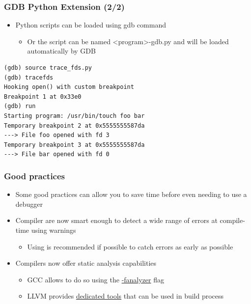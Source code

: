 \begin{frame}[fragile]
  \frametitle{GDB Python Extension (2/2)}
  \begin{itemize}
    \item Python scripts can be loaded using gdb  command
    \begin{itemize}
      \item Or the script can be named <program>-gdb.py and will be loaded automatically by GDB
    \end{itemize}
  \end{itemize}
  \begin{block}{}
    \begin{verbatim}
(gdb) source trace_fds.py 
(gdb) tracefds 
Hooking open() with custom breakpoint
Breakpoint 1 at 0x33e0
(gdb) run
Starting program: /usr/bin/touch foo bar
Temporary breakpoint 2 at 0x5555555587da
---> File foo opened with fd 3
Temporary breakpoint 3 at 0x5555555587da
---> File bar opened with fd 0
    \end{verbatim}
  \end{block}
\end{frame}

\begin{frame}
  \frametitle{Good practices}
  \begin{itemize}
    \item Some good practices can allow you to save time before even needing to
          use a debugger
    \item Compiler are now smart enough to detect a wide range of errors at
          compile-time using warnings
    \begin{itemize}
      \item Using  is recommended if possible to catch
            errors as early as possible
    \end{itemize}
    \item Compilers now offer static analysis capabilities
    \begin{itemize}
      \item GCC allows to do so using the \href{https://gcc.gnu.org/onlinedocs/gcc-11.1.0/gcc/Static-Analyzer-Options.html}{-fanalyzer} flag
      \item LLVM provides \href{https://clang-analyzer.llvm.org/command-line.html}{dedicated tools} that can be used in build process
    \end{itemize}
  \end{itemize}
\end{frame}

